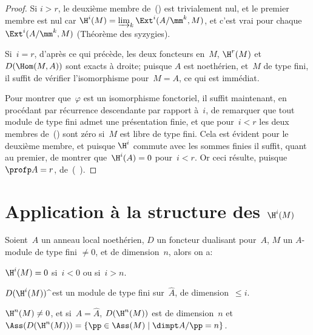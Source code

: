 \begin{proof}
Si $i>r$\pageoriginale, le deuxi\`eme membre de~() est trivialement nul, et le premier membre est nul car $\H^{i}(M)=\varinjlim_{k}\Ext^{i}(A/\mm^{k}, M)$, et c'est vrai pour chaque $\Ext^{i}(A/\mm^{k}, M)$ (Th\'eor\`eme des syzygies).

Si~$i=r$, d'apr\`es ce qui pr\'ec\`ede, les deux foncteurs en~$M$, $\H^{r}(M)$ et~$D(\Hom(M, A))$ sont exacts \`a droite; puisque $A$ est noeth\'erien, et~$M$ de type fini, il suffit de v\'erifier l'isomorphisme pour~$M=A$, ce qui est imm\'ediat.

Pour montrer que~$\varphi$ est un isomorphisme fonctoriel, il suffit maintenant, en proc\'edant par r\'ecurrence descendante par rapport \`a~$i$, de remarquer que tout module de type fini admet une pr\'esentation finie, et que pour~$i<r$ les deux membres de~() sont z\'ero si~$M$ est libre de type fini. Cela est \'evident pour le deuxi\`eme membre, et puisque $\H^{i}$ commute avec les sommes finies il suffit, quant au premier, de montrer que~$\H^{i}(A)=0$ pour~$i<r$. Or ceci r\'esulte, puisque $\profp A=r$, de~(~).
\skipqed
\end{proof}

\section{Application \`a la structure des $\H^i(M)$} \label{V.3}

\setcounter{equation}{14}

\begin{theoreme} \label{V.3.1} Soient~$A$ un anneau local noeth\'erien, $D$ un foncteur dualisant pour~$A$, $M$ un $A$-module de type fini $\neq 0$, et de dimension~$n$, alors on a:
\begin{enumeratei}
\item
$\H^{i}(M)=0$ si~$i<0$ ou si~$i>n$.
\item
$D(\H^{i}(M))\;\widehat{\hbox{}}$ est un module de type fini sur~$\widehat{A}$, de dimension~$\leq i$.
\item
$\H^{n}(M)\neq 0$, et si~$A=\widehat{A}$, $D(\H^{n}(M))$ est de dimension~$n$ et $\Ass(D(\H^{n}(M)))=\{ \pp\in\Ass(M) \mid \dimpt A/\pp=n\}$.
\end{enumeratei}
\end{theoreme}

